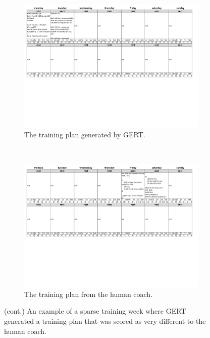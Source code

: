\begin{figure}\ContinuedFloat
    \begin{subfigure}[t]{\textwidth}
        \centering
        \includegraphics[width=\textwidth,trim={0 8cm 0 0},clip]{chapters/figures/result_examples/worst_pred.pdf}
        \captionsetup{width=.9\linewidth}
        \caption{The training plan generated by GERT.}
    \end{subfigure}\\[1ex]
    \begin{subfigure}[t]{\textwidth}
        \centering
        \includegraphics[width=\textwidth,trim={0 8cm 0 0},clip]{chapters/figures/result_examples/worst_true.pdf}
        \captionsetup{width=.9\linewidth}
        \caption{The training plan from the human coach.}
    \end{subfigure}
    \caption{(cont.) An example of a sparse training week where GERT generated a training plan that was scored as very different to the human coach.}
    \label{fig:gert_worst_example}
\end{figure}

